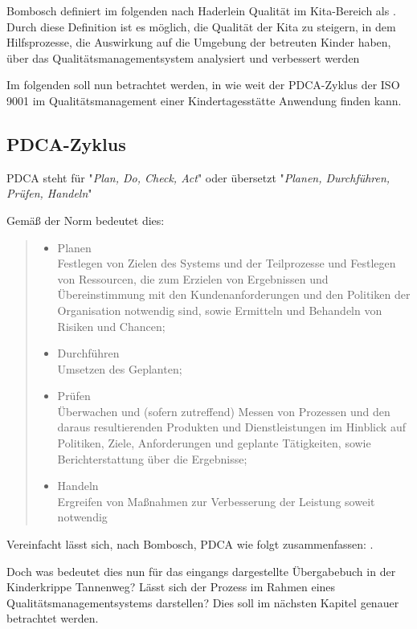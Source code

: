 Bombosch definiert im folgenden nach Haderlein Qualität im Kita-Bereich als  \citep[][198]{KitaMana}. Durch diese Definition ist es möglich, die Qualität der Kita zu steigern, in dem Hilfsprozesse, die Auswirkung auf die Umgebung der betreuten Kinder haben, über das Qualitätsmanagementsystem analysiert und verbessert werden

Im folgenden soll nun betrachtet werden, in wie weit der PDCA-Zyklus der ISO 9001 im Qualitätsmanagement einer Kindertagesstätte Anwendung finden kann.

\subsection{PDCA-Zyklus}
PDCA steht für "{}\textit{Plan, Do, Check, Act}"{} oder übersetzt "{}\textit{Planen, Durchführen, Prüfen, Handeln}"{}

Gemäß der Norm bedeutet dies:

\blockquote{\begin{itemize}
		\item Planen \\
			Festlegen von Zielen des Systems und der Teilprozesse und Festlegen von Ressourcen, die zum Erzielen von Ergebnissen und Übereinstimmung mit den Kundenanforderungen und den Politiken der Organisation notwendig sind, sowie Ermitteln und Behandeln von Risiken und Chancen;
		\item Durchführen\\
			Umsetzen des Geplanten;
		\item Prüfen\\
			Überwachen und (sofern zutreffend) Messen von Prozessen und den daraus resultierenden Produkten und Dienstleistungen im Hinblick auf Politiken, Ziele, Anforderungen und geplante Tätigkeiten, sowie Berichterstattung über die Ergebnisse;
		\item Handeln\\
			Ergreifen von Maßnahmen zur Verbesserung der Leistung soweit notwendig
	\end{itemize}}\citep[][14]{ISO9001}

Vereinfacht lässt sich, nach Bombosch, PDCA wie folgt zusammenfassen:  \citep[][199]{KitaMana}.

Doch was bedeutet dies nun für das eingangs dargestellte Übergabebuch in der Kinderkrippe Tannenweg? Lässt sich der Prozess im Rahmen eines Qualitätsmanagementsystems darstellen? Dies soll im nächsten Kapitel genauer betrachtet werden.

